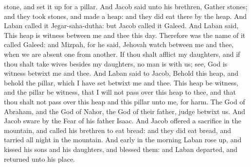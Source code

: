 stone, and set it up for a pillar. And Jacob said unto his brethren, Gather stones; and they took stones, and made a heap: and they did eat there by the heap. And Laban called it Jegar-saha-dutha: but Jacob called it Galeed. And Laban said, This heap is witness between me and thee this day. Therefore was the name of it called Galeed: and Mizpah, for he said, Jehovah watch between me and thee, when we are absent one from another. If thou shalt afflict my daughters, and if thou shalt take wives besides my daughters, no man is with us; see, God is witness betwixt me and thee. And Laban said to Jacob, Behold this heap, and behold the pillar, which I have set betwixt me and thee. This heap be witness, and the pillar be witness, that I will not pass over this heap to thee, and that thou shalt not pass over this heap and this pillar unto me, for harm. The God of Abraham, and the God of Nahor, the God of their father, judge betwixt us. And Jacob sware by the Fear of his father Isaac. And Jacob offered a sacrifice in the mountain, and called his brethren to eat bread: and they did eat bread, and tarried all night in the mountain. And early in the morning Laban rose up, and kissed his sons and his daughters, and blessed them: and Laban departed, and returned unto his place. 


